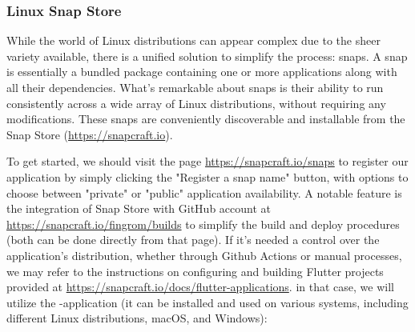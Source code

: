 
\subsubsection{Linux Snap Store}

While the world of Linux distributions can appear complex due to the sheer variety available, there is a unified 
solution to simplify the process: snaps. A snap is essentially a bundled package containing one or more applications 
along with all their dependencies. What's remarkable about snaps is their ability to run consistently across a wide 
array of Linux distributions, without requiring any modifications. These snaps are conveniently discoverable and 
installable from the Snap Store (\href{https://snapcraft.io}{https://snapcraft.io}).

To get started, we should visit the page \href{https://snapcraft.io/snaps}{https://snapcraft.io/snaps} to register 
our application by simply clicking the "Register a snap name" button, with options to choose between "private" or 
"public" application availability. A notable feature is the integration of Snap Store with GitHub account at 
\href{https://snapcraft.io/fingrom/builds}{https://snapcraft.io/fingrom/builds} to simplify the build and deploy 
procedures (both can be done directly from that page). If it's needed a control over the application's distribution, 
whether through Github Actions or manual processes, we may refer to the instructions on configuring and building 
Flutter projects provided at 
\href{https://snapcraft.io/docs/flutter-applications}{https://snapcraft.io/docs/flutter-applications}.
in that case, we will utilize the -application (it can be installed and used on various systems, including 
different Linux distributions, macOS, and Windows):

